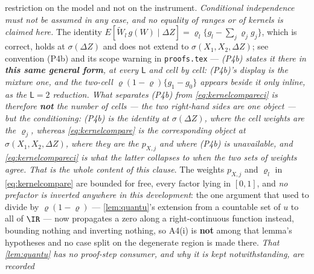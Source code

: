 \begin{remark}
restriction on the model and not on the instrument. \emph{Conditional independence must not be assumed in
any case, and no equality of ranges or of kernels is claimed here.} The identity
$E[\widetilde W_l\,g(W)\mid\Delta Z]=\varrho_l\{g_l-\sum_{j}\varrho_jg_j\}$, which is correct, holds at
$\sigma(\Delta Z)$ and does not extend to $\sigma(X_1,X_2,\Delta Z)$; see convention (P4b) and its scope
warning in \texttt{proofs.tex} --- \emph{(P4b) states it there in \textbf{this same general form}, at
every $\mathsf L$ and cell by cell: (P4b)'s display is the mixture one, and the two-cell
$\varrho(1-\varrho)\{g_1-g_0\}$ appears beside it only inline, as the $\mathsf L=2$ reduction. What
separates (P4b) from \eqref{eq:kernelcompareci} is therefore \textbf{not} the number of cells --- the two
right-hand sides are one object --- but the conditioning: (P4b) is the identity at $\sigma(\Delta Z)$,
where the cell weights are the $\varrho_j$, whereas \eqref{eq:kernelcompare} is the corresponding object
at $\sigma(X_1,X_2,\Delta Z)$, where they are the $p_{X,j}$ and where (P4b) is unavailable, and
\eqref{eq:kernelcompareci} is what the latter collapses to when the two sets of weights agree. That is
the whole content of this clause}.
The weights $p_{X,j}$ and $\varrho_l$ in \eqref{eq:kernelcompare} are
bounded for free, every factor lying in $[0,1]$, and \emph{no prefactor is inverted anywhere in this
development}: the one argument that used to divide by $\varrho(1-\varrho)$ --- \cref{lem:quantu}'s
extension from a countable set of $u$ to all of $\IR$ --- now propagates a zero along a right-continuous
function instead, bounding nothing and inverting nothing, so A4(i) is \textbf{not} among that lemma's
hypotheses and no case split on the degenerate region is made there.
\emph{That \cref{lem:quantu} has no proof-step consumer, and why it is kept notwithstanding, are recorded
}
\end{remark}
